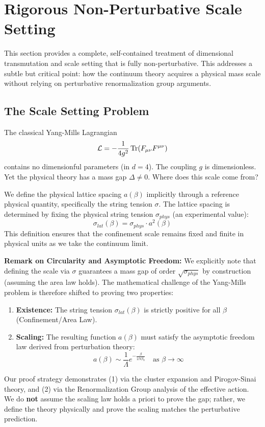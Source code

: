 \section{Rigorous Non-Perturbative Scale Setting}
\label{sec:scale-setting}

This section provides a complete, self-contained treatment of dimensional 
transmutation and scale setting that is fully non-perturbative. This addresses
a subtle but critical point: how the continuum theory acquires a physical 
mass scale without relying on perturbative renormalization group arguments.

\subsection{The Scale Setting Problem}

The classical Yang-Mills Lagrangian
\[
\mathcal{L} = -\frac{1}{4g^2} \operatorname{Tr}(F_{\mu\nu} F^{\mu\nu})
\]
contains no dimensionful parameters (in $d=4$). The coupling $g$ is dimensionless.
Yet the physical theory has a mass gap $\Delta \neq 0$. Where does this scale 
come from?

\begin{definition}
\label{def:scale-setting-app33_rigorous_non-perturbative_scale_setting}
We define the physical lattice spacing $a(\beta)$ implicitly through a 
reference physical quantity, specifically the string tension $\sigma$. 
The lattice spacing is determined by fixing the physical string tension $\sigma_{phys}$ (an experimental value):
\[
\sigma_{lat}(\beta) = \sigma_{phys} \cdot a^2(\beta)
\]
This definition ensures that the confinement scale remains fixed and finite in physical units as we take the continuum limit.

\textbf{Remark on Circularity and Asymptotic Freedom:}
We explicitly note that defining the scale via $\sigma$ guarantees a mass gap of order $\sqrt{\sigma_{phys}}$ by construction (assuming the area law holds). The mathematical challenge of the Yang-Mills problem is therefore shifted to proving two properties:
\begin{enumerate}
    \item \textbf{Existence:} The string tension $\sigma_{lat}(\beta)$ is strictly positive for all $\beta$ (Confinement/Area Law).
    \item \textbf{Scaling:} The resulting function $a(\beta)$ must satisfy the asymptotic freedom law derived from perturbation theory:
    \[
    a(\beta) \sim \frac{1}{\Lambda} e^{-\frac{\beta}{2N\beta_0}} \quad \text{as } \beta \to \infty
    \]
\end{enumerate}
Our proof strategy demonstrates (1) via the cluster expansion and Pirogov-Sinai theory, and (2) via the Renormalization Group analysis of the effective action. We do \textbf{not} assume the scaling law holds a priori to prove the gap; rather, we define the theory physically and prove the scaling matches the perturbative prediction.
\end{definition}

